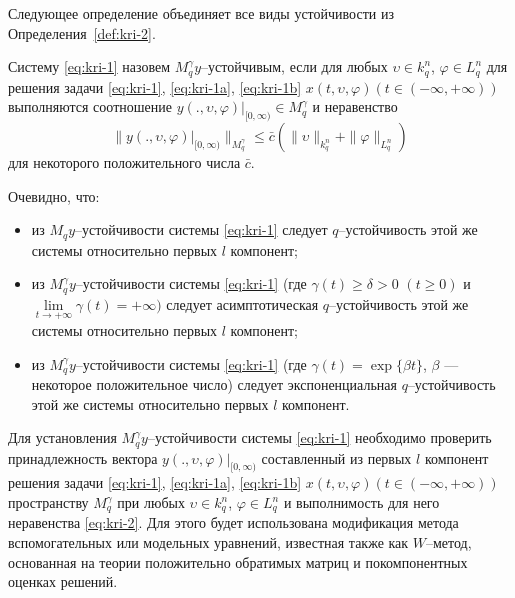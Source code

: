 Следующее определение объединяет все виды устойчивости из
Определения~\ref{def:kri-2}.

\begin{definition}\label{def:kri-3}
    Систему \eqref{eq:kri-1} назовем  $M_q^\gamma y
    $--устойчивым, если для любых $\upsilon \in k^n_q$, $\varphi \in
    L^n_q$ для решения задачи \eqref{eq:kri-1}, \eqref{eq:kri-1a}, \eqref{eq:kri-1b}   $x(t,\upsilon,
    \varphi)(t \in (-\infty, +\infty))$ выполняются  соотношение $y(.,
    \upsilon, \varphi)|_{[0,\infty)} \in M_q^\gamma$ и неравенство
    \begin{equation}
        \label{eq:kri-2}
        \|y(., \upsilon, \varphi)|_{[0,\infty)}\|_{M_q^\gamma} \le \bar c\left(\|\upsilon\|_{k^n_q} +
        \|\varphi \|_{L^n_q}\right)
    \end{equation}
    для некоторого положительного числа $\bar c$.
\end{definition}

Очевидно, что:
\begin{itemize}
    \item из  $M_qy$--устойчивости системы \eqref{eq:kri-1}
    следует $q$--устойчивость этой же системы относительно  первых $l$
    компонент;

    \item из $M_q^\gamma y$--устойчивости системы \eqref{eq:kri-1}
    (где $\gamma (t) \ge \delta > 0$ $(t \ge 0)$ и $\lim \limits _{t
    \rightarrow +\infty } \gamma (t) = +\infty )$ следует
    асимптотическая $q$--устойчивость этой же системы относительно
    первых $l$ компонент;

    \item из $M_q^\gamma y$--устойчивости системы \eqref{eq:kri-1}
    (где $\gamma (t) = \exp \{\beta t\}$, $\beta$ --- некоторое
    положительное число) следует экспоненциальная $q$--устойчивость этой
    же системы относительно первых $l$ компонент.
\end{itemize}


Для установления $M_q^\gamma y$--устойчивости системы \eqref{eq:kri-1} необходимо
проверить принадлежность вектора $y(., \upsilon,\varphi
)|_{[0,\infty)}$ составленный из первых $l$ компонент решения задачи
\eqref{eq:kri-1}, \eqref{eq:kri-1a}, \eqref{eq:kri-1b} $x(t,\upsilon, \varphi)(t \in (-\infty, +\infty))$
пространству $M_q^\gamma$ при любых $\upsilon \in k^n_q$, $\varphi
\in L^n_q$ и выполнимость для него неравенства \eqref{eq:kri-2}. Для этого будет
использована модификация метода вспомогательных  или модельных
уравнений, известная также как $W$--метод, основанная на теории
положительно обратимых матриц и покомпонентных оценках решений.

